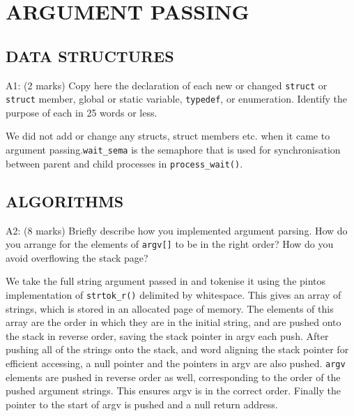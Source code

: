 \section{ARGUMENT PASSING}

\subsection*{DATA STRUCTURES}

\noindent A1: (2 marks)
Copy here the declaration of each new or changed \texttt{struct} or \texttt{struct} member, global or static variable, \texttt{typedef}, or enumeration.  Identify the purpose of each in 25 words or less.

We did not add or change any structs, struct members etc. when it came to argument passing.\texttt{wait\_sema} is the semaphore that is used for synchronisation between parent and child processes in \texttt{process\_wait()}.





\subsection*{ALGORITHMS}

\noindent A2: (8 marks)
Briefly describe how you implemented argument parsing.  How do
you arrange for the elements of \texttt{argv[]} to be in the right order?
How do you avoid overflowing the stack page?


We take the full string argument passed in and tokenise it using the pintos implementation of \texttt{strtok\_r()} delimited by whitespace. This gives an array of strings, which is stored in an allocated page of memory. The elements of this array are the order in which they are in the initial string, and are pushed onto the stack in reverse order, saving the stack pointer in argv each push. After pushing all of the strings onto the stack, and word aligning the stack pointer for efficient accessing, a null pointer and the pointers in argv are also pushed. \texttt{argv} elements are pushed in reverse order as well, corresponding to the order of the pushed argument strings. This ensures argv is in the correct order. Finally the pointer to the start of argv is pushed and a null return address.

